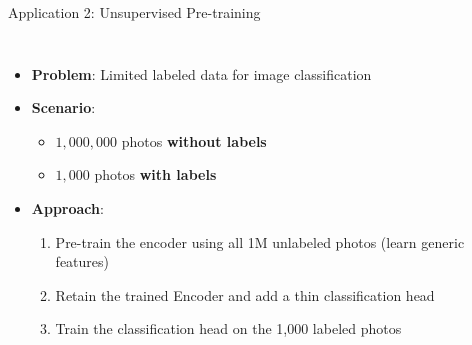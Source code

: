 \documentclass[5pt,aspectratio=169]{beamer}
\begin{document}
\begin{frame}{Application 2: Unsupervised Pre-training}
  \begin{columns}
    \begin{itemize}
      \item \textbf{Problem}: Limited labeled data for image classification
      \item \textbf{Scenario}:
        \begin{itemize}
          \item $1,000,000$ photos \textbf{without labels}
          \item $1,000$ photos \textbf{with labels}
        \end{itemize}
      \item \textbf{Approach}:
        \begin{enumerate}
          \item Pre-train the encoder using all 1M unlabeled photos (learn generic features)
          \item Retain the trained Encoder and add a thin classification head
          \item Train the classification head on the 1,000 labeled photos
        \end{enumerate}
    \end{itemize}
    
    \centering
\end{columns}
\end{frame}
\end{document}
